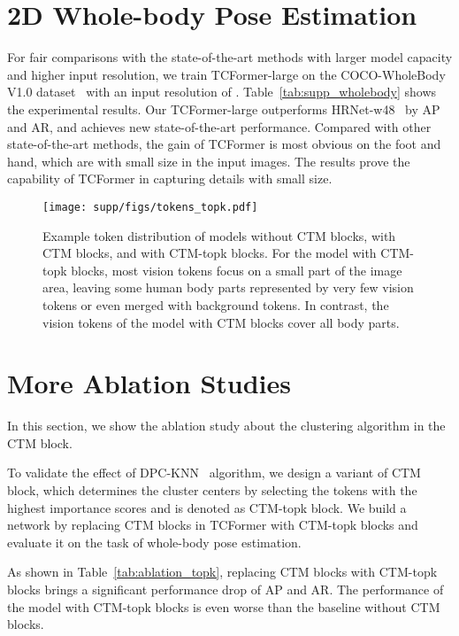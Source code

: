 \documentclass[10pt,twocolumn,letterpaper]{article}
\begin{document}
\section{2D Whole-body Pose Estimation}
For fair comparisons with the state-of-the-art methods with larger model capacity and higher input resolution, we train TCFormer-large on the COCO-WholeBody V1.0 dataset~\cite{jin2020whole} with an input resolution of . Table~\ref{tab:supp_wholebody} shows the experimental results. Our TCFormer-large outperforms HRNet-w48~\cite{sun2019deep} by  AP and  AR, and achieves new state-of-the-art performance. Compared with other state-of-the-art methods, the gain of TCFormer is most obvious on the foot and hand, which are with small size in the input images. The results prove the capability of TCFormer in capturing details with small size.




\begin{figure}[tb]
	\centering
	\texttt{[image: supp/figs/tokens\_topk.pdf]}
	\caption{
	Example token distribution of models without CTM blocks, with CTM blocks, and with CTM-topk blocks. For the model with CTM-topk blocks, most vision tokens focus on a small part of the image area, leaving some human body parts represented by very few vision tokens or even merged with background tokens.
	In contrast, the vision tokens of the model with CTM blocks cover all body parts. 
	}
	\label{fig:topk}
\end{figure}

\section{More Ablation Studies}

In this section, we show the ablation study about the clustering algorithm in the CTM block. 

To validate the effect of DPC-KNN~\cite{du2016study} algorithm, we design a variant of CTM block, which determines the cluster centers by selecting the tokens with the highest importance scores and is denoted as CTM-topk block. We build a network by replacing CTM blocks in TCFormer with CTM-topk blocks and evaluate it on the task of whole-body pose estimation. 

As shown in Table~\ref{tab:ablation_topk}, replacing CTM blocks with CTM-topk blocks brings a significant performance drop of  AP and  AR. The performance of the model with CTM-topk blocks is even worse than the baseline without CTM blocks.
\end{document}
